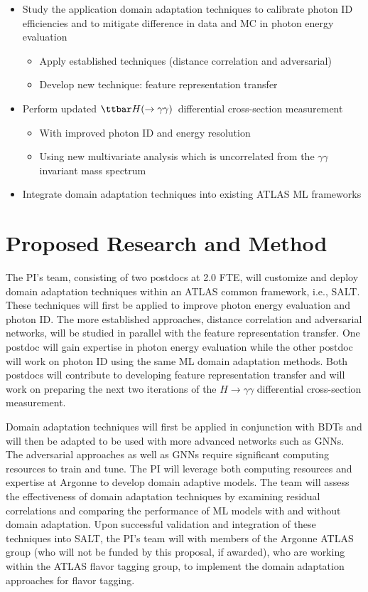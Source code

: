 \documentclass[letter, USenglish, 11pt, subfigure]{article}
\newcommand{\tthyy}{\ensuremath{\ttbar H(\to\gamma\gamma)}}
\begin{document}
\begin{itemize}
\item Study the application domain adaptation techniques to calibrate photon ID efficiencies and to mitigate difference in data and MC in photon energy evaluation
  \begin{itemize}
  \item Apply established techniques (distance correlation and adversarial)
  \item Develop new technique: feature representation transfer
  \end{itemize}
\item Perform updated \tthyy\ differential cross-section measurement
  \begin{itemize}
  \item With improved photon ID and energy resolution
  \item Using new multivariate analysis which is uncorrelated from the $\gamma\gamma$ invariant mass spectrum
  \end{itemize}
\item Integrate domain adaptation techniques into existing ATLAS ML frameworks
\end{itemize}
\clearpage
\section{Proposed Research and Method}

The PI's team, consisting of two postdocs at 2.0 FTE, will customize and deploy domain adaptation techniques within an ATLAS common framework, i.e., SALT. These techniques will first be applied to improve photon energy evaluation and photon ID. The more established approaches, distance correlation and adversarial networks, will be studied in parallel with the feature representation transfer. One postdoc will gain expertise in photon energy evaluation while the other postdoc will work on photon ID using the same ML domain adaptation methods. Both postdocs will contribute to developing feature representation transfer and will work on preparing the next two iterations of the $H\to\gamma\gamma$ differential cross-section measurement.

Domain adaptation techniques will first be applied in conjunction with BDTs and will then be adapted to be used with more advanced networks such as GNNs. The adversarial approaches as well as GNNs require significant computing resources to train and tune. The PI will leverage both computing resources and expertise at Argonne to develop domain adaptive models.
The team will assess the effectiveness of domain adaptation techniques by examining residual correlations and comparing the performance of ML models with and without domain adaptation. Upon successful validation and integration of these techniques into SALT, the PI's team will with members of the Argonne ATLAS group (who will not be funded by this proposal, if awarded), who are working within the ATLAS flavor tagging group, to implement the domain adaptation approaches for flavor tagging.
\end{document}
